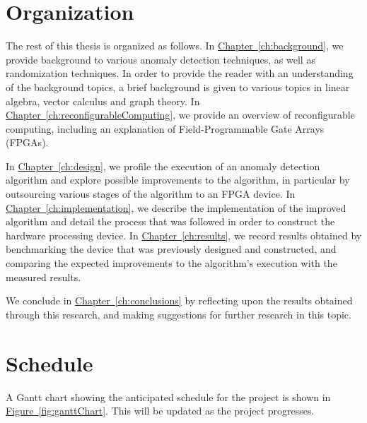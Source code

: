 \section{Organization}
\label{sec:organization}
The rest of this thesis is organized as follows. In \hyperref[ch:background]
{Chapter~\ref{ch:background}}, we provide background to various anomaly 
detection techniques, as well as randomization techniques. In order to provide 
the reader with an understanding of the background topics, a brief background is
given to various topics in linear algebra, vector calculus and graph theory. In
\hyperref[ch:reconfigurableComputing]{Chapter~\ref{ch:reconfigurableComputing}}, 
we provide an overview of reconfigurable computing, including an explanation of 
Field-Programmable Gate Arrays (FPGAs).

In \hyperref[ch:design] {Chapter~\ref{ch:design}}, we profile the execution of 
an anomaly detection algorithm and explore possible improvements to the 
algorithm, in particular by outsourcing various stages of the algorithm to an 
FPGA device. In \hyperref[ch:implementation]{Chapter~\ref{ch:implementation}}, 
we describe the implementation of the improved algorithm and detail the process 
that was followed in order to construct the hardware processing device. In 
\hyperref[ch:results]{Chapter~\ref{ch:results}}, we record results obtained by 
benchmarking the device that was previously designed and constructed, and 
comparing the expected improvements to the algorithm's execution with the 
measured results.

We conclude in \hyperref[ch:conclusions] {Chapter~\ref{ch:conclusions}} by 
reflecting upon the results obtained through this research, and making 
suggestions for further research in this topic.
 
\section{Schedule}
\label{sec:schedule}
A Gantt chart showing the anticipated schedule for the project is shown in 
\hyperref[fig:ganttChart]{Figure~\ref{fig:ganttChart}}. This will be updated as 
the project progresses.

